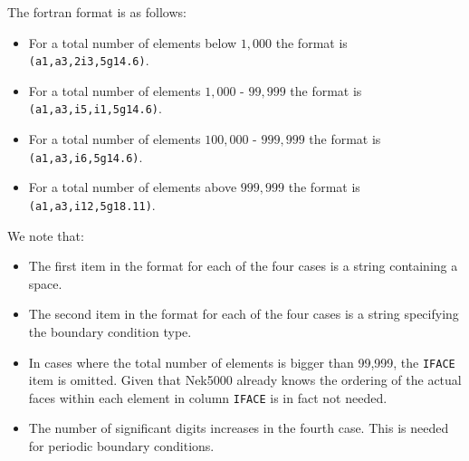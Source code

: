 \begin{description}
The fortran format is as follows:
\begin{itemize}
\item For a total number of elements below $1,000$ the format is \texttt{(a1,a3,2i3,5g14.6)}.
\item For a total number of elements $1,000$ - $99,999$ the format is \texttt{(a1,a3,i5,i1,5g14.6)}.
\item For a total number of elements $100,000$ - $999,999$ the format is \texttt{(a1,a3,i6,5g14.6)}.
\item For a total number of elements above $999,999$ the format is \texttt{(a1,a3,i12,5g18.11)}.
\end{itemize}
We note that:
\begin{itemize}
\item The first item in the format for each of the four cases is a string containing a space.
\item The second item in the format for each of the four cases is a string specifying the boundary condition type.
\item In cases where the total number of elements is bigger than 99,999, the \texttt{IFACE} item is omitted. Given that Nek5000 already knows the ordering of the actual faces within each element in column \texttt{IFACE} is in fact not needed.
\item The number of significant digits increases in the fourth case. This is needed for periodic boundary conditions.
\end{itemize}
     
\end{description}

